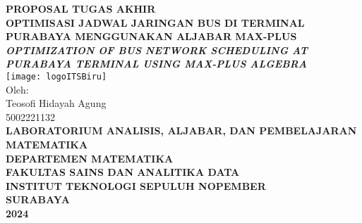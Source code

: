 \documentclass[12pt]{article}
\numberwithin{lemma}{subsection}
\begin{document}
	\begin{center}
		\textbf{PROPOSAL TUGAS AKHIR}\\
		\vspace{1cm}
		\textbf{\MakeUppercase{Optimisasi Jadwal Jaringan Bus di Terminal Purabaya Menggunakan Aljabar Max-Plus}}\\
		\vspace{1cm}
		\textbf{\textit{\MakeUppercase{Optimization of Bus Network Scheduling at Purabaya Terminal Using Max-Plus Algebra}}}\\
		\vspace{2cm}
		\texttt{[image: logoITSBiru]}\\
		\vspace{3cm}
		Oleh:\\
		Teosofi Hidayah Agung\\
		5002221132\\
		\vspace{3.5cm}
		\textbf{
		LABORATORIUM ANALISIS, ALJABAR, DAN PEMBELAJARAN MATEMATIKA\\
		DEPARTEMEN MATEMATIKA\\
		FAKULTAS SAINS DAN ANALITIKA DATA\\
		INSTITUT TEKNOLOGI SEPULUH NOPEMBER\\
		SURABAYA\\
		2024}
	\end{center}
\pagebreak
{}
\end{document}

